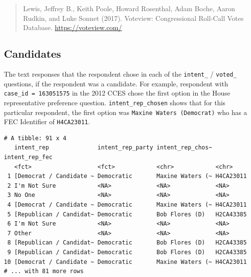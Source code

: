 \documentclass[10pt,article,oneside]{memoir}
\theoremstyle{definition}
\newenvironment{Shaded}{\begin{snugshade}}{\end{snugshade}}
\newcommand{\DecValTok}[1]{\textcolor[rgb]{0.00,0.00,0.81}{#1}}
\newcommand{\KeywordTok}[1]{\textcolor[rgb]{0.13,0.29,0.53}{\textbf{#1}}}
\newcommand{\NormalTok}[1]{#1}
\newcommand{\OperatorTok}[1]{\textcolor[rgb]{0.81,0.36,0.00}{\textbf{#1}}}
\newcommand{\StringTok}[1]{\textcolor[rgb]{0.31,0.60,0.02}{#1}}
\begin{document}
\begin{quote}
Lewis, Jeffrey B., Keith Poole, Howard Rosenthal, Adam Boche, Aaron
Rudkin, and Luke Sonnet (2017). Voteview: Congressional Roll-Call Votes
Database. \url{https://voteview.com/}
\end{quote}

\hypertarget{candidates}{%
\subsection{Candidates}\label{candidates}}

The text responses that the respondent chose in each of the
\texttt{intent\_} / \texttt{voted\_} questions, if the respondent was a
candidate. For example, respondent with \texttt{case\_id\ =\ 163051575}
in the 2012 CCES chose the first option in the House representative
preference question. \texttt{intent\_rep\_chosen} shows that for this
particular respondent, the first option was
\texttt{Maxine\ Waters\ (Democrat)} who has a FEC Identifier of
\texttt{H4CA23011}.

\begin{Shaded}
\end{Shaded}

\begin{verbatim}
# A tibble: 91 x 4
   intent_rep              intent_rep_party intent_rep_chos~ intent_rep_fec
   <fct>                   <fct>            <chr>            <chr>         
 1 [Democrat / Candidate ~ Democratic       Maxine Waters (~ H4CA23011     
 2 I'm Not Sure            <NA>             <NA>             <NA>          
 3 No One                  <NA>             <NA>             <NA>          
 4 [Democrat / Candidate ~ Democratic       Maxine Waters (~ H4CA23011     
 5 [Republican / Candidat~ Democratic       Bob Flores (D)   H2CA43385     
 6 I'm Not Sure            <NA>             <NA>             <NA>          
 7 Other                   <NA>             <NA>             <NA>          
 8 [Republican / Candidat~ Democratic       Bob Flores (D)   H2CA43385     
 9 [Republican / Candidat~ Democratic       Bob Flores (D)   H2CA43385     
10 [Democrat / Candidate ~ Democratic       Maxine Waters (~ H4CA23011     
# ... with 81 more rows
\end{verbatim}
\end{document}
